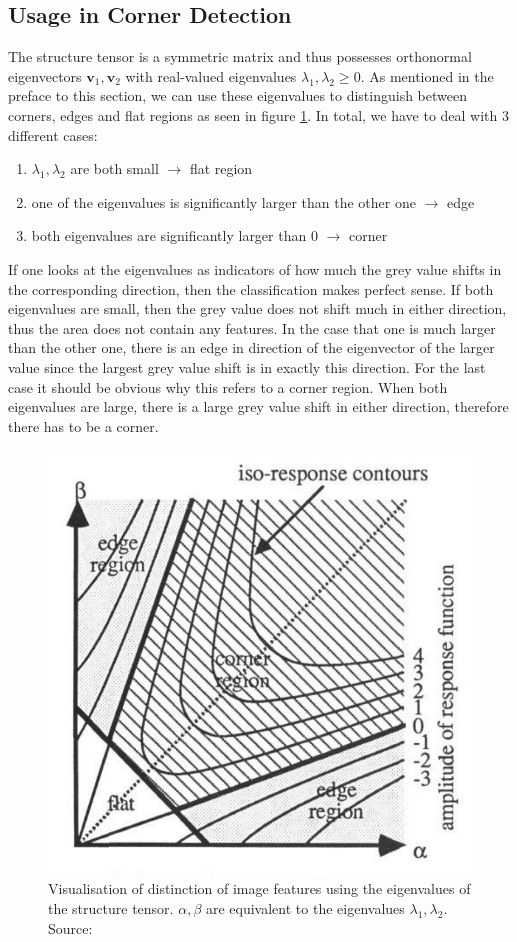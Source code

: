 \subsection{Usage in Corner Detection}\label{sub:Corner}
The structure tensor is a symmetric matrix and thus possesses orthonormal eigenvectors $\boldsymbol v_1,
\boldsymbol v_2$ with real-valued eigenvalues $\lambda_1, \lambda_2 \geq 0$. \cite{ipcv} As
mentioned in the preface to this section, we can use these eigenvalues to distinguish between
corners, edges and flat regions as seen in figure \ref{fig:Structure}.
In total, we have to deal with 3 different cases:
\begin{enumerate}
    \item $\lambda_1, \lambda_2$ are both small $\rightarrow$ flat region
    \item one of the eigenvalues is significantly larger than the other one $\rightarrow$ edge
    \item both eigenvalues are significantly larger than 0 $\rightarrow$ corner
\end{enumerate}
If one looks at the eigenvalues as indicators of how much the grey value shifts in the
corresponding
direction, then the classification makes perfect sense. If both eigenvalues are small, then the
grey value does not shift much in either direction, thus the area does not contain any features.
In the case that one is much larger than the other one, there is an edge in direction of the
eigenvector of the larger value since the largest grey value shift is in exactly this direction.
For the last case it should be obvious why this refers to a corner region. When both eigenvalues
are large, there is a large grey value shift in either direction, therefore there has to be a
corner.\\
\begin{figure}[h]
    \centering
    \includegraphics[width=0.6\linewidth]{../Images/structure_tensor.png}
    \caption{Visualisation of distinction of image features using the eigenvalues of the structure
        tensor. $\alpha, \beta$ are equivalent to the eigenvalues $\lambda_1, \lambda_2$. Source: \cite{harris88}}\label{fig:Structure}
\end{figure}
